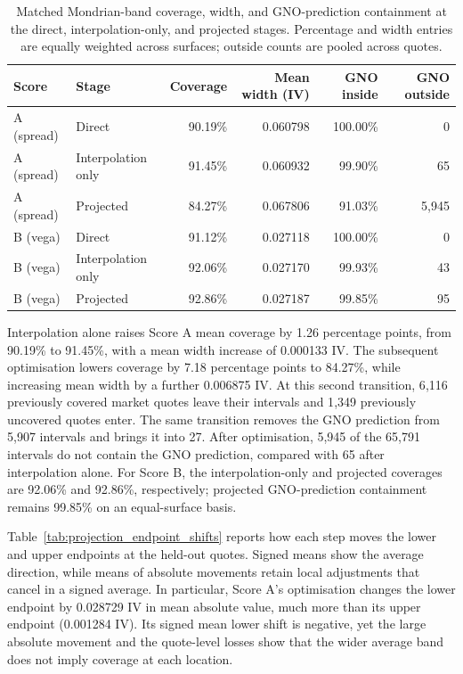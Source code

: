 \begin{table}[H]
\centering
\small
\begin{tabular}{|l|l|r|r|r|r|}
\hline
\textbf{Score} & \textbf{Stage} & \textbf{Coverage} & \textbf{Mean width (IV)} & \textbf{GNO inside} & \textbf{GNO outside} \\
\hline
A (spread) & Direct             & 90.19\% & 0.060798 & 100.00\% & 0 \\
A (spread) & Interpolation only & 91.45\% & 0.060932 & 99.90\%  & 65 \\
A (spread) & Projected          & 84.27\% & 0.067806 & 91.03\%  & 5{,}945 \\
\hline
B (vega)   & Direct             & 91.12\% & 0.027118 & 100.00\% & 0 \\
B (vega)   & Interpolation only & 92.06\% & 0.027170 & 99.93\%  & 43 \\
B (vega)   & Projected          & 92.86\% & 0.027187 & 99.85\%  & 95 \\
\hline
\end{tabular}
\caption{Matched Mondrian-band coverage, width, and GNO-prediction containment at the direct, interpolation-only, and projected stages. Percentage and width entries are equally weighted across surfaces; outside counts are pooled across quotes.}
\label{tab:projection_stages}
\end{table}

Interpolation alone raises Score A mean coverage by 1.26 percentage points, from 90.19\% to 91.45\%, with a mean width increase of 0.000133 IV. The subsequent optimisation lowers coverage by 7.18 percentage points to 84.27\%, while increasing mean width by a further 0.006875 IV. At this second transition, 6{,}116 previously covered market quotes leave their intervals and 1{,}349 previously uncovered quotes enter. The same transition removes the GNO prediction from 5{,}907 intervals and brings it into 27. After optimisation, 5{,}945 of the 65{,}791 intervals do not contain the GNO prediction, compared with 65 after interpolation alone. For Score B, the interpolation-only and projected coverages are 92.06\% and 92.86\%, respectively; projected GNO-prediction containment remains 99.85\% on an equal-surface basis.

Table~\ref{tab:projection_endpoint_shifts} reports how each step moves the lower and upper endpoints at the held-out quotes. Signed means show the average direction, while means of absolute movements retain local adjustments that cancel in a signed average. In particular, Score A's optimisation changes the lower endpoint by 0.028729 IV in mean absolute value, much more than its upper endpoint (0.001284 IV). Its signed mean lower shift is negative, yet the large absolute movement and the quote-level losses show that the wider average band does not imply coverage at each location.

